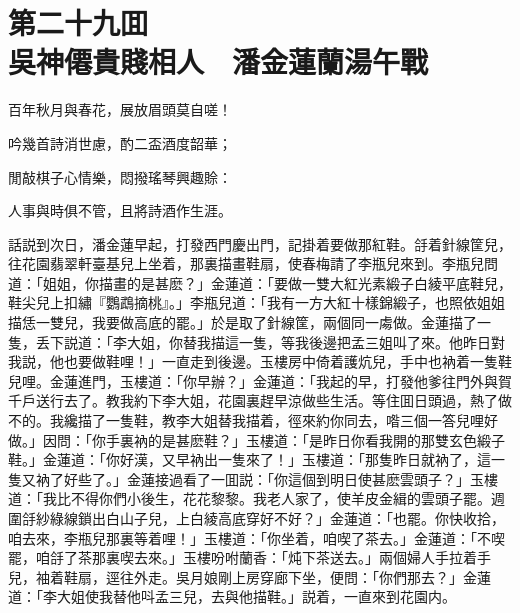 
\chapter*{第二十九囬　\\吳神僊貴賤相人　潘金蓮蘭湯午戰}


\begin{myquote}
百年秋月與春花，展放眉頭莫自嗟！

吟幾首詩消世慮，酌二盃酒度韶華；

閒敲棋子心情樂，悶撥瑤琴興趣賒：

人事與時俱不管，且將詩酒作生涯。
\end{myquote}

話説到次日，潘金蓮早起，打發西門慶出門，記掛着要做那紅鞋。㧱着針線筐兒，往花園翡翠軒臺基兒上坐着，那裏描畫鞋扇，使春梅請了李瓶兒來到。李瓶兒問道：「姐姐，你描畫的是甚麽？」金蓮道：「要做一雙大紅光素緞子白綾平底鞋兒，鞋尖兒上扣繡『鸚鵡摘桃』。」李瓶兒道：「我有一方大紅十樣錦緞子，也照依姐姐描恁一雙兒，我要做高底的罷。」於是取了針線筐，兩個同一䖏做。金蓮描了一隻，丢下説道：「李大姐，你替我描這一隻，等我後邊把孟三姐叫了來。他昨日對我説，他也要做鞋哩！」一直走到後邊。玉樓房中倚着護炕兒，手中也衲着一隻鞋兒哩。金蓮進門，玉樓道：「你早辦？」金蓮道：「我起的早，打發他爹往門外與賀千戶送行去了。教我約下李大姐，花園裏趕早涼做些生活。等住囬日頭過，熱了做不的。我纔描了一隻鞋，教李大姐替我描着，徑來約你同去，喒三個一答兒哩好做。」因問：「你手裏衲的是甚麽鞋？」玉樓道：「是昨日你看我開的那雙玄色緞子鞋。」金蓮道：「你好漢，又早衲出一隻來了！」玉樓道：「那隻昨日就衲了，這一隻又衲了好些了。」金蓮接過看了一囬説：「你這個到明日使甚麽雲頭子？」玉樓道：「我比不得你們小後生，花花黎黎。我老人家了，使羊皮金緝的雲頭子罷。週圍㧱紗綠線鎖出白山子兒，上白綾高底穿好不好？」金蓮道：「也罷。你快收拾，咱去來，李瓶兒那裏等着哩！」玉樓道：「你坐着，咱喫了茶去。」金蓮道：「不喫罷，咱㧱了茶那裏喫去來。」玉樓吩咐蘭香：「炖下茶送去。」兩個婦人手拉着手兒，袖着鞋扇，逕往外走。吳月娘剛上房穿廊下坐，便問：「你們那去？」金蓮道：「李大姐使我替他呌孟三兒，去與他描鞋。」説着，一直來到花園内。

